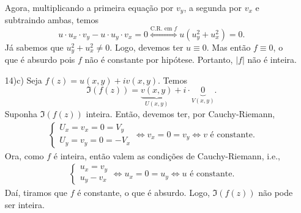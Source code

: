 \documentclass[12pt,a4paper]{article}
\begin{document}
\begin{enumerate}
	Agora, multiplicando a primeira equação por $v_y$, a segunda por $v_x$ e subtraindo ambas, temos
	$$
	u\cdot u_x\cdot v_y - u\cdot u_y\cdot v_x = 0 \stackrel{\text{C.R. em }f}{\Longleftrightarrow} u(u_y^2 + u_x^2) = 0.
	$$ 
	Já sabemos que $u_y^2+u_x^2\neq 0$. Logo, devemos ter $u\equiv 0$. Mas então $f \equiv 0$, o que é absurdo pois $f$ não é constante por hipótese. Portanto, $|f|$ não é inteira.
	
	\item[14)c)] Seja $f(z) = u(x,y) + iv(x,y)$. Temos
	$$
	\Im(f(z)) = \underbrace{v(x,y)}_{U(x,y)} + i\cdot\underbrace{0}_{V(x,y)}.
	$$
	Suponha $\Im(f(z))$ inteira. Então, devemos ter, por Cauchy-Riemann,
	\begin{align*}
	\begin{cases}
	U_x = v_x = 0 = V_y \\
	U_y = v_y = 0 = -V_x
	\end{cases}\Longleftrightarrow
	v_x = 0 = v_y\Longleftrightarrow v\text{ é constante.}
	\end{align*}
	Ora, como $f$ é inteira, então valem as condições de Cauchy-Riemann, i.e.,
	\begin{align*}
	\begin{cases}
	u_x = v_y \\
	u_y -v_x
	\end{cases}\Longleftrightarrow
	u_x = 0 = u_y\Longleftrightarrow u\text{ é constante.}
	\end{align*}
	Daí, tiramos que $f$ é constante, o que é absurdo. Logo, $\Im(f(z))$ não pode ser inteira.
	\end{enumerate}
	
\end{document}
